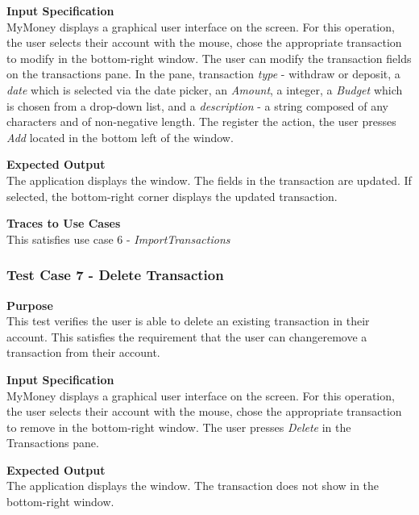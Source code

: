 \documentclass[12pt]{article}
\begin{document}
\noindent
{\bf Input Specification}\\
MyMoney displays a graphical user interface on the screen.
For this operation, the user selects their account with the mouse,
chose the appropriate transaction to modify in the bottom-right window.
The user can modify the transaction fields on the transactions pane.
In the pane, transaction \textit{type} - withdraw or deposit, a \textit{date}
which is selected via the date picker, an \textit{Amount}, a integer, a \textit{Budget} which is chosen
from a drop-down list, and a \textit{description} - a string composed of any characters and
of non-negative length. The register the action, the user presses \textit{Add} located in the bottom left
of the window.   
                                                          

\noindent
{\bf Expected Output}\\
The application displays the window.    
The fields in the transaction are updated.
If selected, the bottom-right corner displays the updated transaction.

\noindent
    {\bf Traces to Use Cases}\\
    This satisfies use case 6 - \textit{ImportTransactions}


\clearpage %
\subsubsection{Test Case 7 - Delete Transaction} \label{TC-7}
\noindent
{\bf Purpose}\\
This test verifies the user is able to delete an existing transaction in their account.
This satisfies the requirement that the user can changeremove a transaction from their account.
                                                        
\noindent
{\bf Input Specification}\\
MyMoney displays a graphical user interface on the screen.
For this operation, the user selects their account with the mouse,
chose the appropriate transaction to remove in the bottom-right window.
The user presses \textit{Delete} in the Transactions pane.
                                                          

\noindent
{\bf Expected Output}\\
The application displays the window.       
The transaction does not show in the bottom-right window.
\end{document}

